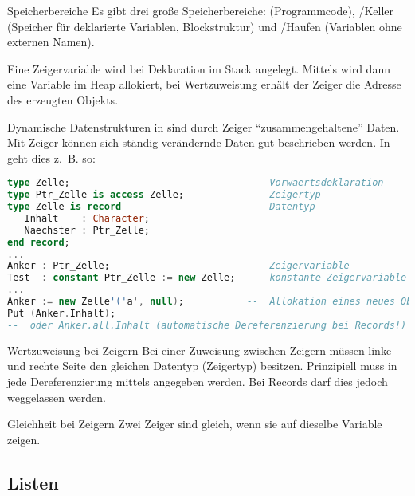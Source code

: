 \begin{Def}{Speicherbereiche}
    Es gibt drei große Speicherbereiche: 
    (Programmcode), /Keller (Speicher für deklarierte Variablen,
    Blockstruktur) und /Haufen (Variablen ohne externen Namen).
    
    Eine Zeigervariable wird bei Deklaration im Stack angelegt. Mittels
     wird dann eine Variable im Heap allokiert, bei Wertzuweisung
    erhält der Zeiger die Adresse des erzeugten Objekts.
\end{Def}

\begin{Def}{Dynamische Datenstrukturen in \Ada{}}
     sind durch Zeiger
    "`zusammengehaltene"' Daten.
    Mit Zeiger können sich ständig verändernde Daten gut beschrieben werden.
    In \Ada{} geht dies z.~B. so:
\begin{lstlisting}[language=ada]
type Zelle;                               --  Vorwaertsdeklaration
type Ptr_Zelle is access Zelle;           --  Zeigertyp
type Zelle is record                      --  Datentyp
   Inhalt    : Character;
   Naechster : Ptr_Zelle;
end record;
...
Anker : Ptr_Zelle;                        --  Zeigervariable
Test  : constant Ptr_Zelle := new Zelle;  --  konstante Zeigervariable
...
Anker := new Zelle'('a', null);           --  Allokation eines neues Objekts, Nullpointer
Put (Anker.Inhalt);
--  oder Anker.all.Inhalt (automatische Dereferenzierung bei Records!)
\end{lstlisting}
\end{Def}

\begin{Def}{Wertzuweisung bei Zeigern}
    Bei einer Zuweisung zwischen Zeigern müssen linke und rechte Seite den
    gleichen Datentyp (Zeigertyp) besitzen.
    Prinzipiell muss in \Ada{} jede Dereferenzierung mittels 
    angegeben werden.
    Bei Records darf dies jedoch weggelassen werden.
\end{Def}

\begin{Def}{Gleichheit bei Zeigern}
    Zwei Zeiger sind gleich, wenn sie auf dieselbe Variable zeigen.
\end{Def}

\subsection{%
    Listen%
}

